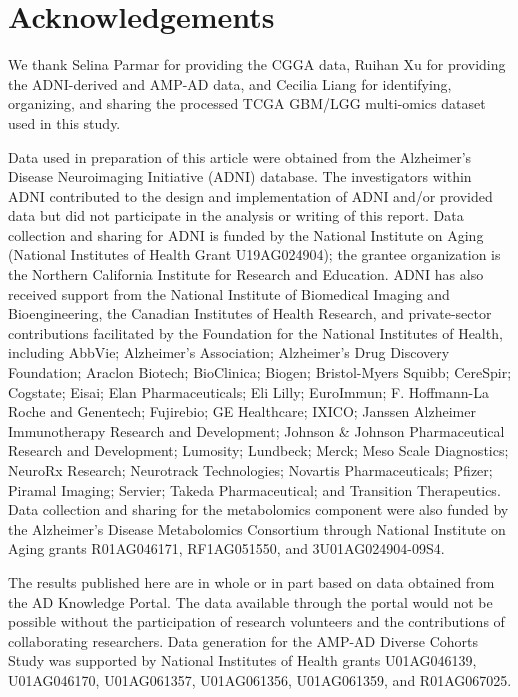 \FloatBarrier
\section*{Acknowledgements}

We thank Selina Parmar for providing the CGGA data, Ruihan Xu for providing the ADNI-derived and AMP-AD data, and Cecilia Liang for identifying, organizing, and sharing the processed TCGA GBM/LGG multi-omics dataset used in this study.

Data used in preparation of this article were obtained from the Alzheimer's Disease Neuroimaging Initiative (ADNI) database. The investigators within ADNI contributed to the design and implementation of ADNI and/or provided data but did not participate in the analysis or writing of this report. Data collection and sharing for ADNI is funded by the National Institute on Aging (National Institutes of Health Grant U19AG024904); the grantee organization is the Northern California Institute for Research and Education. ADNI has also received support from the National Institute of Biomedical Imaging and Bioengineering, the Canadian Institutes of Health Research, and private-sector contributions facilitated by the Foundation for the National Institutes of Health, including AbbVie; Alzheimer's Association; Alzheimer's Drug Discovery Foundation; Araclon Biotech; BioClinica; Biogen; Bristol-Myers Squibb; CereSpir; Cogstate; Eisai; Elan Pharmaceuticals; Eli Lilly; EuroImmun; F. Hoffmann-La Roche and Genentech; Fujirebio; GE Healthcare; IXICO; Janssen Alzheimer Immunotherapy Research and Development; Johnson \& Johnson Pharmaceutical Research and Development; Lumosity; Lundbeck; Merck; Meso Scale Diagnostics; NeuroRx Research; Neurotrack Technologies; Novartis Pharmaceuticals; Pfizer; Piramal Imaging; Servier; Takeda Pharmaceutical; and Transition Therapeutics. Data collection and sharing for the metabolomics component were also funded by the Alzheimer's Disease Metabolomics Consortium through National Institute on Aging grants R01AG046171, RF1AG051550, and 3U01AG024904-09S4.

The results published here are in whole or in part based on data obtained from the AD Knowledge Portal. The data available through the portal would not be possible without the participation of research volunteers and the contributions of collaborating researchers. Data generation for the AMP-AD Diverse Cohorts Study was supported by National Institutes of Health grants U01AG046139, U01AG046170, U01AG061357, U01AG061356, U01AG061359, and R01AG067025.

